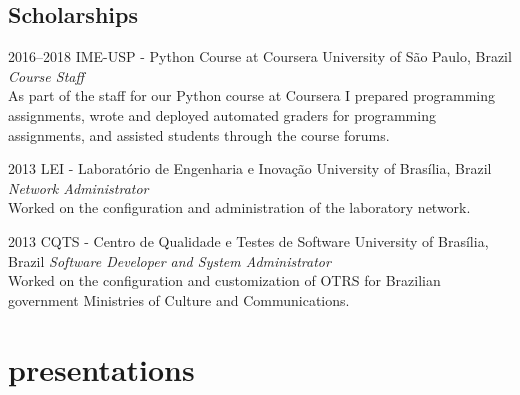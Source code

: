 \documentclass[print]{friggeri-cv}
\begin{document}
\subsection{Scholarships}

\begin{entrylist}

\entry
{2016--2018}
{IME-USP - Python Course at Coursera}
{University of São Paulo, Brazil}
{\emph{Course Staff} \\
As part of the staff for our Python course at Coursera I prepared programming
  assignments, wrote and deployed automated graders for programming
  assignments, and assisted students through the course forums.
  }

\entry
{2013}
{LEI - Laboratório de Engenharia e Inovação}
{University of Brasília, Brazil}
{\emph{Network Administrator} \\
  Worked on the configuration and administration of the laboratory network. \\
}



\entry
{2013}
{CQTS - Centro de Qualidade e Testes de Software}
{University of Brasília, Brazil}
{\emph{Software Developer and System Administrator} \\
  Worked on the configuration and customization of OTRS for Brazilian
  government Ministries of Culture and Communications.
  }

\end{entrylist}

\section{presentations}
\end{document}
